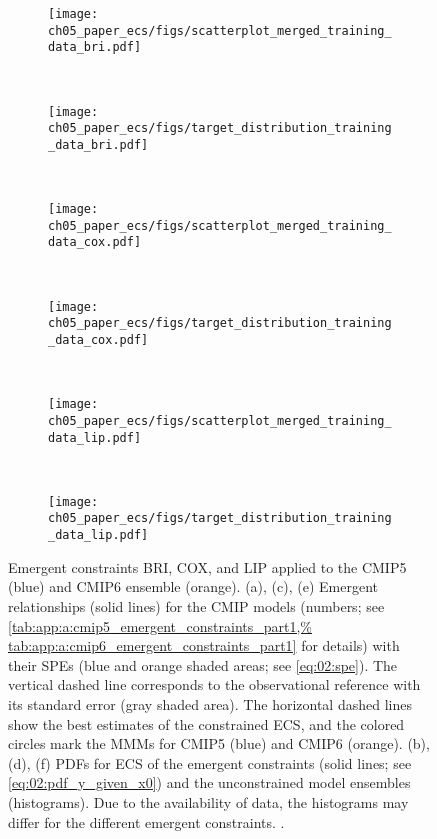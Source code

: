 \begin{figure}[p]
  \centering
  \begin{subfigure}[b]{\SmallSubfigureWidth{}}
    \texttt{[image: 
      ch05\_paper\_ecs/figs/scatterplot\_merged\_training\_data\_bri.pdf]}
    \caption{}
    \label{fig:05:bri_cox_lip:a}
  \end{subfigure}
  ~
  \begin{subfigure}[b]{\SmallSubfigureWidth{}}
    \texttt{[image: 
      ch05\_paper\_ecs/figs/target\_distribution\_training\_data\_bri.pdf]}
    \caption{}
    \label{fig:05:bri_cox_lip:b}
  \end{subfigure}
  \\
  \begin{subfigure}[b]{\SmallSubfigureWidth{}}
    \texttt{[image: 
      ch05\_paper\_ecs/figs/scatterplot\_merged\_training\_data\_cox.pdf]}
    \caption{}
    \label{fig:05:bri_cox_lip:c}
  \end{subfigure}
  ~
  \begin{subfigure}[b]{\SmallSubfigureWidth{}}
    \texttt{[image: 
      ch05\_paper\_ecs/figs/target\_distribution\_training\_data\_cox.pdf]}
    \caption{}
    \label{fig:05:bri_cox_lip:d}
  \end{subfigure}
  \\
  \begin{subfigure}[b]{\SmallSubfigureWidth{}}
    \texttt{[image: 
      ch05\_paper\_ecs/figs/scatterplot\_merged\_training\_data\_lip.pdf]}
    \caption{}
    \label{fig:05:bri_cox_lip:e}
  \end{subfigure}
  ~
  \begin{subfigure}[b]{\SmallSubfigureWidth{}}
    \texttt{[image: 
      ch05\_paper\_ecs/figs/target\_distribution\_training\_data\_lip.pdf]}
    \caption{}
    \label{fig:05:bri_cox_lip:f}
  \end{subfigure}
  \caption[
    Emergent constraints BRI, COX, and LIP applied to the \acs{CMIP}5 and
    \acs{CMIP}6 ensemble.
  ]{
    Emergent constraints BRI, COX, and LIP applied to the \acs{CMIP}5 (blue)
    and \acs{CMIP}6 ensemble (orange). (a), (c), (e) Emergent relationships
    (solid lines) for the \acs{CMIP} models (numbers; see
    \cref{tab:app:a:cmip5_emergent_constraints_part1,%
      tab:app:a:cmip6_emergent_constraints_part1} for details) with their
    \aclp{SPE} (blue and orange shaded areas; see \cref{eq:02:spe}). The
    vertical dashed line corresponds to the observational reference with its
    standard error (gray shaded area). The horizontal dashed lines show the
    best estimates of the constrained \acf{ECS}, and the colored circles mark
    the \aclp{MMM} for \acs{CMIP}5 (blue) and \acs{CMIP}6 (orange). (b), (d),
    (f) \Aclp{PDF} for \acs{ECS} of the emergent constraints (solid lines;
    see \cref{eq:02:pdf_y_given_x0}) and the unconstrained model ensembles
    (histograms). Due to the availability of data, the histograms may differ
    for the different emergent constraints. .
  }
  \label{fig:05:bri_cox_lip}
\end{figure}


